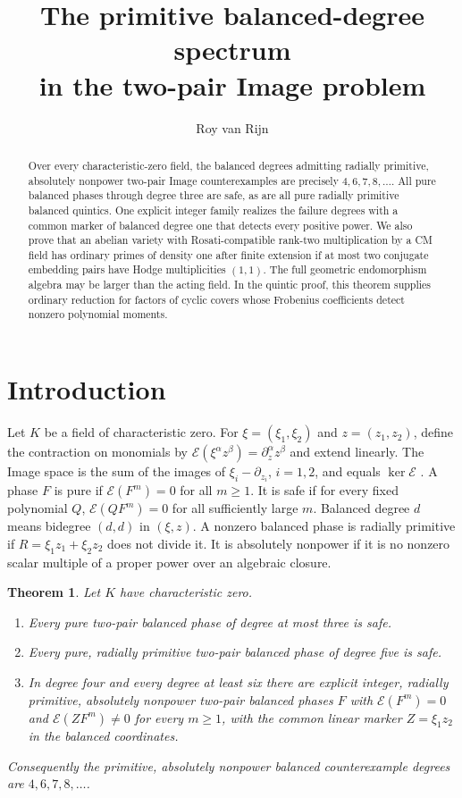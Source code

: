 \documentclass[11pt]{article}
\title{The primitive balanced-degree spectrum\\in the two-pair Image problem}
\author{Roy van Rijn}
\date{}
\newtheorem{theorem}{Theorem}
\begin{document}
\maketitle

\begin{abstract}
Over every characteristic-zero field, the balanced degrees admitting radially
primitive, absolutely nonpower two-pair Image counterexamples are precisely
\(4,6,7,8,\ldots\). All pure balanced phases through degree three are safe,
as are all pure radially primitive balanced quintics. One explicit integer
family realizes the failure degrees with a common marker of balanced degree one that detects
every positive power. We also prove that an abelian variety with
Rosati-compatible rank-two multiplication by a CM field has ordinary
primes of density one after finite extension if at most two conjugate
embedding pairs have Hodge multiplicities \((1,1)\). The full geometric
endomorphism algebra may be larger than the acting field. In the quintic
proof, this theorem supplies ordinary reduction for factors of cyclic
covers whose Frobenius coefficients detect nonzero polynomial moments.
\end{abstract}

\section{Introduction}

Let \(K\) be a field of characteristic zero. For
\(\xi=(\xi_1,\xi_2)\) and \(z=(z_1,z_2)\), define the contraction on monomials by
\(\mathcal E(\xi^\alpha z^\beta)=\partial_z^\alpha z^\beta\) and extend
linearly. The Image space is the sum of the images of
\(\xi_i-\partial_{z_i}\), \(i=1,2\), and equals \(\ker\mathcal E\)
\cite[Theorem~3.3]{image}.
A phase \(F\) is pure if \(\mathcal E(F^m)=0\) for all \(m\geq1\).
It is safe if for every fixed polynomial \(Q\), \(\mathcal E(QF^m)=0\)
for all sufficiently large \(m\). Balanced degree \(d\) means bidegree
\((d,d)\) in \((\xi,z)\). A nonzero balanced phase is radially primitive
if \(R=\xi_1z_1+\xi_2z_2\) does not divide it. It is absolutely nonpower if
it is no nonzero scalar multiple of a proper power over an algebraic closure.

\begin{theorem}\label{thm:spectrum}
Let \(K\) have characteristic zero.
\begin{enumerate}
\item Every pure two-pair balanced phase of degree at most three is safe.
\item Every pure, radially primitive two-pair balanced phase of degree five
      is safe.
\item In degree four and every degree at least six there are explicit integer,
      radially primitive, absolutely nonpower two-pair balanced phases \(F\)
      with \(\mathcal E(F^m)=0\) and \(\mathcal E(ZF^m)\ne0\) for every
      \(m\geq1\), with the common linear marker \(Z=\xi_1z_2\) in the
      balanced coordinates.
\end{enumerate}
Consequently the primitive, absolutely nonpower balanced counterexample
degrees are \(4,6,7,8,\ldots\).
\end{theorem}
\end{document}
